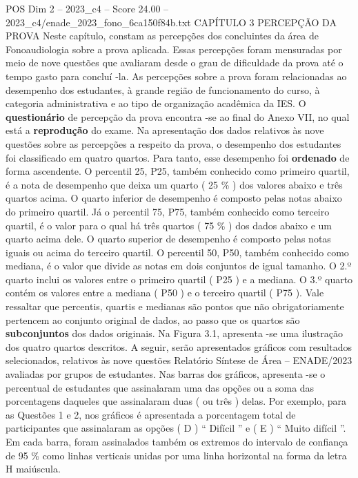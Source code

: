 \begin{textsample}{POS Dim 2 – 2023\_c4 – Score 24.00 – 2023\_c4/enade\_2023\_fono\_6ca150f84b.txt}  \label{ex:f2_pos_001}
CAPÍTULO 3 PERCEPÇÃO DA PROVA Neste capítulo, constam as percepções dos concluintes da área de Fonoaudiologia sobre a prova aplicada.
Essas percepções foram mensuradas por meio de nove questões que avaliaram desde o grau de dificuldade da prova até o tempo gasto para concluí -la.
As percepções sobre a prova foram relacionadas ao desempenho dos estudantes, à grande região de funcionamento do curso, à categoria administrativa e ao tipo de organização acadêmica da IES.
O \textbf{questionário} de percepção da prova encontra -se ao final do Anexo VII, no qual está a \textbf{reprodução} do exame.
Na apresentação dos dados relativos às nove questões sobre as percepções a respeito da prova, o desempenho dos estudantes foi classificado em quatro quartos.
Para tanto, esse desempenho foi \textbf{ordenado} de forma ascendente.
O percentil 25, P25, também conhecido como primeiro quartil, é a nota de desempenho que deixa um quarto ( 25 \% ) dos valores abaixo e três quartos acima.
O quarto inferior de desempenho é composto pelas notas abaixo do primeiro quartil.
Já o percentil 75, P75, também conhecido como terceiro quartil, é o valor para o qual há três quartos ( 75 \% ) dos dados abaixo e um quarto acima dele.
O quarto superior de desempenho é composto pelas notas iguais ou acima do terceiro quartil.
O percentil 50, P50, também conhecido como mediana, é o valor que divide as notas em dois conjuntos de igual tamanho.
O 2.º quarto inclui os valores entre o primeiro quartil ( P25 ) e a mediana.
O 3.º quarto contém os valores entre a mediana ( P50 ) e o terceiro quartil ( P75 ).
Vale ressaltar que percentis, quartis e medianas são pontos que não obrigatoriamente pertencem ao conjunto original de dados, ao passo que os quartos são \textbf{subconjuntos} dos dados originais.
Na Figura 3.1, apresenta -se uma ilustração dos quatro quartos descritos.
A seguir, serão apresentados gráficos com resultados selecionados, relativos às nove questões Relatório Síntese de Área – ENADE/2023 avaliadas por grupos de estudantes.
Nas barras dos gráficos, apresenta -se o percentual de estudantes que assinalaram uma das opções ou a soma das porcentagens daqueles que assinalaram duas ( ou três ) delas.
Por exemplo, para as Questões 1 e 2, nos gráficos é apresentada a porcentagem total de participantes que assinalaram as opções ( D ) “ Difícil ” e ( E ) “ Muito difícil ”.
Em cada barra, foram assinalados também os extremos do intervalo de confiança de 95 \% como linhas verticais unidas por uma linha horizontal na forma da letra H maiúscula.

\end{textsample}
